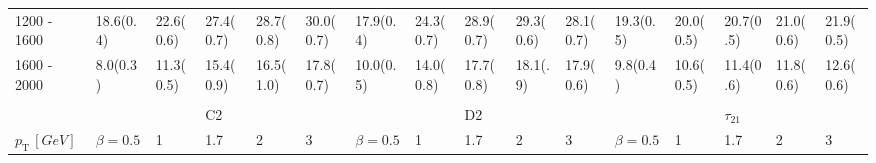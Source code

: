 \begin{table}
{\begin{tabular}{llllllllllllllll}
\multicolumn{1}{l||}{1200 - 1600}    & \multicolumn{1}{l|}{18.6(0.4)}        & \multicolumn{1}{l|}{22.6(0.6)} & \multicolumn{1}{l|}{27.4(0.7)} 		 & \multicolumn{1}{l|}{28.7(0.8)} 				& \multicolumn{1}{l||}{30.0(0.7)} 	& \multicolumn{1}{l|}{17.9(0.4)}        	& \multicolumn{1}{l|}{24.3(0.7)} 	& \multicolumn{1}{l|}{28.9(0.7)} 						& \multicolumn{1}{l|}{\cellcolor{Red!50}29.3(0.6)} 		& \multicolumn{1}{l||}{28.1(0.7)} 							& \multicolumn{1}{l|}{19.3(0.5)}        & \multicolumn{1}{l|}{20.0(0.5)} & 	 \multicolumn{1}{l|}{20.7(0.5)} & 	\multicolumn{1}{l|}{21.0(0.6)} & \multicolumn{1}{l|}{21.9(0.5)} \\
\multicolumn{1}{l||}{1600 - 2000}    & \multicolumn{1}{l|}{8.0(0.3)}         & \multicolumn{1}{l|}{11.3(0.5)} & \multicolumn{1}{l|}{15.4(0.9)} 		 & \multicolumn{1}{l|}{16.5(1.0)} 				& \multicolumn{1}{l||}{17.8(0.7)} 	& \multicolumn{1}{l|}{10.0(0.5)}        	& \multicolumn{1}{l|}{14.0(0.8)} 	& \multicolumn{1}{l|}{17.7(0.8)} 						& \multicolumn{1}{l|}{\cellcolor{Red!50}18.1(.9)} 		& \multicolumn{1}{l||}{17.9(0.6)} 							& \multicolumn{1}{l|}{9.8(0.4)}         & \multicolumn{1}{l|}{10.6(0.5)} & 	 \multicolumn{1}{l|}{11.4(0.6)} & 	\multicolumn{1}{l|}{11.8(0.6)} & \multicolumn{1}{l|}{12.6(0.6)} \\ \hline
                                    &                                  &                           &                           &                           &                           &                                  &                           &                           &                           &                           &                                  &                           &                           &                           &                           \\
\rowcolor{Gray} \multicolumn{1}{l||}{\textbf{Tracks}}         &                                  &                           & C2                        &                           & \multicolumn{1}{l|}{}     &                                  &                           & D2                        &                           & \multicolumn{1}{l|}{}     &                                  &                           & $\tau_{21}$               &                           & \multicolumn{1}{l|}{}     \\ \hline
\multicolumn{1}{l||}{$p_{\mathrm{T}} \, [GeV]$} & \multicolumn{1}{l|}{\cellcolor{Gray2}$\beta=0.5$} & \multicolumn{1}{l|}{\cellcolor{Gray2}1}    & \multicolumn{1}{l|}{\cellcolor{Gray2}1.7}  & \multicolumn{1}{l|}{\cellcolor{Gray2}2}    & \multicolumn{1}{l||}{\cellcolor{Gray2}3}    & \multicolumn{1}{l|}{\cellcolor{Gray2}$\beta=0.5$} & \multicolumn{1}{l|}{1\cellcolor{Gray2}}    & \multicolumn{1}{l|}{\cellcolor{Gray2}1.7}  & \multicolumn{1}{l|}{\cellcolor{Gray2}2}    & \multicolumn{1}{l||}{\cellcolor{Gray2}3}    & \multicolumn{1}{l|}{\cellcolor{Gray2}$\beta=0.5$} & \multicolumn{1}{l|}{\cellcolor{Gray2}1}    & \multicolumn{1}{l|}{\cellcolor{Gray2}1.7}  & \multicolumn{1}{l|}{\cellcolor{Gray2}2}    & \multicolumn{1}{l|}{\cellcolor{Gray2}3}    \\ \hline \hline

\end{tabular}}
\end{table}
